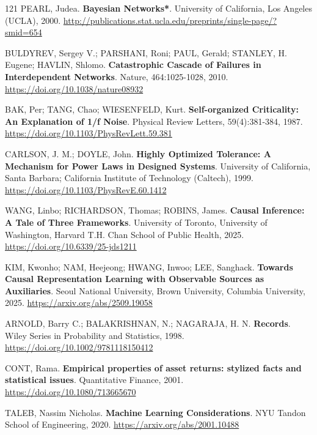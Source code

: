 \begin{thebibliography}{121}
  PEARL, Judea.
  \newblock \textbf{Bayesian Networks*}.
  \newblock University of California, Los Angeles (UCLA), 2000.
  \newblock \url{http://publications.stat.ucla.edu/preprints/single-page/?smid=654}

  BULDYREV, Sergey V.; PARSHANI, Roni; PAUL, Gerald; STANLEY, H. Eugene; HAVLIN, Shlomo.
  \newblock \textbf{Catastrophic Cascade of Failures in Interdependent Networks}.
  \newblock Nature, 464:1025-1028, 2010.
  \newblock \url{https://doi.org/10.1038/nature08932}

  BAK, Per; TANG, Chao; WIESENFELD, Kurt.
  \newblock \textbf{Self-organized Criticality: An Explanation of 1/f Noise}.
  \newblock Physical Review Letters, 59(4):381-384, 1987.
  \newblock \url{https://doi.org/10.1103/PhysRevLett.59.381}

  CARLSON, J. M.; DOYLE, John.
  \newblock \textbf{Highly Optimized Tolerance: A Mechanism for Power Laws in Designed Systems}.
  \newblock University of California, Santa Barbara; California Institute of Technology (Caltech), 1999.
  \newblock \url{https://doi.org/10.1103/PhysRevE.60.1412}

  WANG, Linbo; RICHARDSON, Thomas; ROBINS, James.
  \newblock \textbf{Causal Inference: A Tale of Three Frameworks}.
  \newblock University of Toronto, University of Washington, Harvard T.H. Chan School of Public Health, 2025.
  \newblock \url{https://doi.org/10.6339/25-jds1211}

  KIM, Kwonho; NAM, Heejeong; HWANG, Inwoo; LEE, Sanghack.
  \newblock \textbf{Towards Causal Representation Learning with Observable Sources as Auxiliaries}.
  \newblock Seoul National University, Brown University, Columbia University, 2025.
  \newblock \url{https://arxiv.org/abs/2509.19058}

  ARNOLD, Barry C.; BALAKRISHNAN, N.; NAGARAJA, H. N.
  \newblock \textbf{Records}.
  \newblock Wiley Series in Probability and Statistics, 1998.
  \newblock \url{https://doi.org/10.1002/9781118150412}

  CONT, Rama.
  \newblock \textbf{Empirical properties of asset returns: stylized facts and statistical issues}.
  \newblock Quantitative Finance, 2001.
  \newblock \url{https://doi.org/10.1080/713665670}

  TALEB, Nassim Nicholas.
  \newblock \textbf{Machine Learning Considerations}.
  \newblock NYU Tandon School of Engineering, 2020.
  \newblock \url{https://arxiv.org/abs/2001.10488}


\end{thebibliography}
